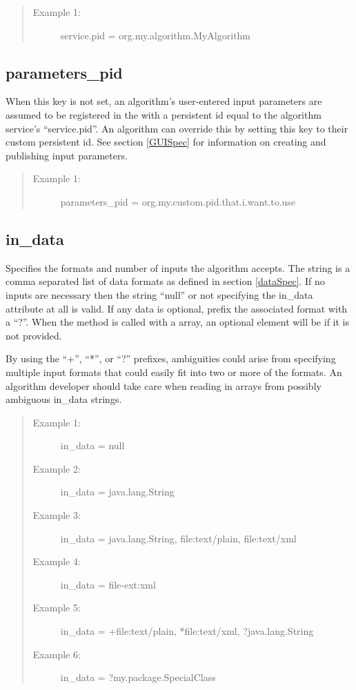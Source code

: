 \begin{quote}
\begin{description}
  \item[Example 1:] service.pid = org.my.algorithm.MyAlgorithm
\end{description}
\end{quote}


\subsection*{parameters\_pid} 

When this key is not set, an algorithm's user-entered input parameters are
assumed to be registered in the  with a persistent id
equal to the algorithm service's ``service.pid''. An algorithm can override this
by setting this key to their custom persistent id. See section \ref{GUISpec}
for information on creating and publishing input parameters.

\begin{quote}
\begin{description}
  \item[Example 1:] parameters\_pid = org.my.custom.pid.that.i.want.to.use
\end{description}
\end{quote}


\subsection*{in\_data} 
Specifies the formats and number of  inputs the
algorithm accepts. The string is a comma separated list of data formats as
defined in section \ref{dataSpec}. If no  inputs are necessary then
the string ``null'' or not specifying the in\_data attribute at all is valid.
If any data is optional, prefix the associated format with a ``?''. When the
 method is called with a 
array, an optional  element will be  if it is not
provided.

By using the ``+'', ``*'', or ``?'' prefixes, ambiguities could arise from
specifying multiple input formats that could easily fit into two or more
of the formats. An algorithm developer should take care when reading
in  arrays from possibly ambiguous in\_data strings.

\begin{quote}
\begin{description}
  \item[Example 1:] in\_data = null
  \item[Example 2:] in\_data = java.lang.String
  \item[Example 3:] in\_data = java.lang.String, file:text/plain, file:text/xml
  \item[Example 4:] in\_data = file-ext:xml
  \item[Example 5:] in\_data = +file:text/plain, *file:text/xml,
  ?java.lang.String
  \item[Example 6:] in\_data = ?my.package.SpecialClass
\end{description}
\end{quote}


